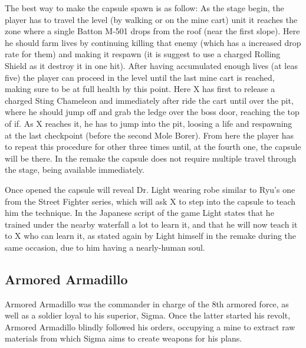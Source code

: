 The best way to make the capsule spawn is as follow: As the stage begin, the player has to travel the level (by walking or on the mine cart) unit it reaches the zone where a single Batton M-501 drops from the roof (near the first slope). Here he should farm lives by continuing killing that enemy (which has a increased drop rate for them)  and making it respawn (it is suggest to use a charged Rolling Shield as it destroy it in one hit). After having accumulated enough lives (at leas five) the player can proceed in the level until the last mine cart is reached, making sure to be at full health by this point. Here X has first to release a charged Sting Chameleon and immediately after ride the cart until over the pit, where he should jump off and grab the ledge over the boss door, reaching the top of if. As X reaches it, he has to jump into the pit, loosing a life and respawning at the last checkpoint (before the second Mole Borer). From here the player has to repeat this procedure for other three times until, at the  fourth one, the capsule will be there. In the remake the capsule does not require multiple travel through the stage, being available immediately.

Once opened the capsule will reveal Dr. Light wearing robe similar to Ryu's one from the Street Fighter series, which will ask X to step into the capsule to teach him the technique. In the Japanese  script of the game\cite{wordpress:X_japanese_script} Light states that he trained under the nearby waterfall a lot to learn it, and that he will now teach it to X who can learn it, as stated again by Light himself in the \mhx remake during the same occasion, due to him having a nearly-human soul.

\subsection{Armored Armadillo}\label{boss:Armored_Armadillo}
Armored Armadillo was the commander in charge of the 8th armored force, as well as a soldier loyal to his superior, Sigma. Once the latter started his revolt, Armored Armadillo blindly followed his orders, occupying a mine to extract raw materials from which Sigma aims to create weapons for his plans.


